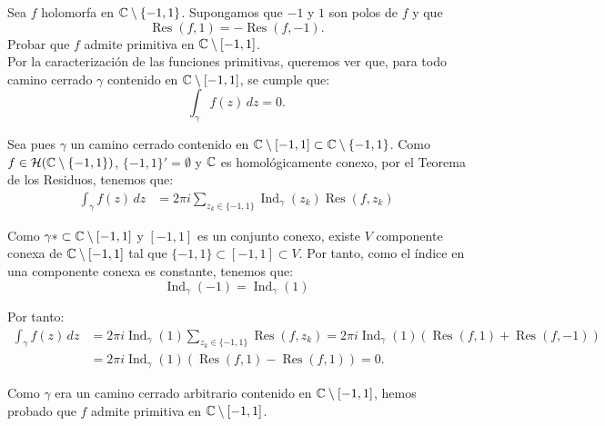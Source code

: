 \documentclass[12pt]{article}
\DeclareMathOperator{\Ind}{Ind}
\DeclareMathOperator{\Res}{Res}
\begin{document}
    \begin{ejercicio}[2.5 puntos]
        Sea $f$ holomorfa en $\mathbb{C}\setminus\{-1, 1\}$. Supongamos que $-1$ y $1$ son polos de $f$ y que
        \[
            \Res(f, 1) = -\Res(f, -1).
        \]
        Probar que $f$ admite primitiva en $\mathbb{C} \setminus [-1, 1]$.\\

        Por la caracterización de las funciones primitivas, queremos ver que, para todo camino cerrado $\gamma$ contenido en $\mathbb{C}\setminus [-1, 1]$, se cumple que:
        \begin{equation*}
            \int_{\gamma} f(z) \, dz = 0.
        \end{equation*}

        Sea pues $\gamma$ un camino cerrado contenido en $\mathbb{C}\setminus [-1, 1]\subset \mathbb{C}\setminus \{-1, 1\}$. Como $f\in \mathcal{H}(\mathbb{C}\setminus \{-1, 1\})$, $\{-1,1\}'=\emptyset$ y $\mathbb{C}$ es homológicamente conexo, por el Teorema de los Residuos, tenemos que:
        \begin{align*}
            \int_{\gamma} f(z) \, dz &= 2\pi i \sum_{z_k\in \{-1, 1\}} \Ind_{\gamma}(z_k) \Res(f, z_k)
        \end{align*}

        Como $\gamma*\subset \mathbb{C}\setminus [-1, 1]$ y $[-1,1]$ es un conjunto conexo, existe $V$ componente conexa de $\mathbb{C}\setminus [-1, 1]$ tal que $\{-1,1\}\subset [-1,1]\subset V$. Por tanto, como el índice en una componente conexa es constante, tenemos que:
        \begin{equation*}
            \Ind_{\gamma}(-1) = \Ind_{\gamma}(1)
        \end{equation*}

        Por tanto:
        \begin{align*}
            \int_{\gamma} f(z) \, dz &= 2\pi i \Ind_{\gamma}(1) \sum_{z_k\in \{-1, 1\}}\Res(f, z_k)
            = 2\pi i \Ind_{\gamma}(1) \left(\Res(f, 1) + \Res(f, -1)\right)\\
            &= 2\pi i \Ind_{\gamma}(1) \left(\Res(f, 1) - \Res(f, 1)\right) = 0.
        \end{align*}

        Como $\gamma$ era un camino cerrado arbitrario contenido en $\mathbb{C}\setminus [-1, 1]$, hemos probado que $f$ admite primitiva en $\mathbb{C}\setminus [-1, 1]$.
    \end{ejercicio}
\end{document}
